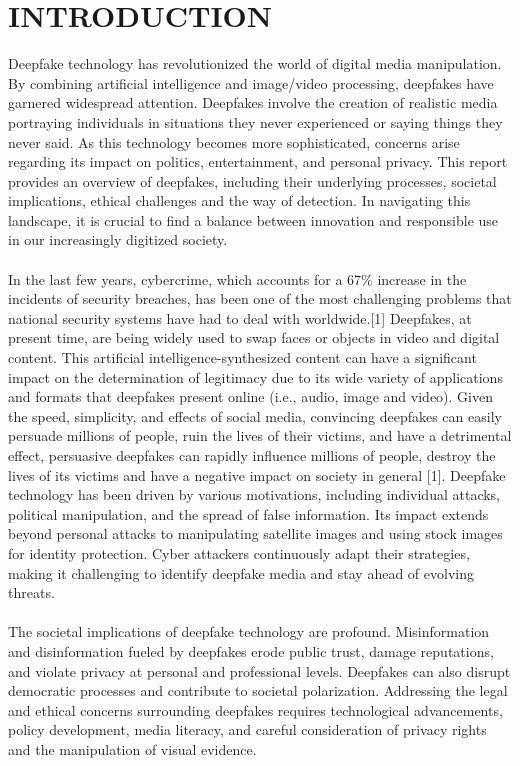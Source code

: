 

\section{INTRODUCTION}
Deepfake technology has revolutionized the world of digital media manipulation. By combining artificial intelligence and image/video processing, deepfakes have garnered widespread attention. Deepfakes involve the creation of realistic media portraying individuals in situations they never experienced or saying things they never said. As this technology becomes more sophisticated, concerns arise regarding its impact on politics, entertainment, and personal privacy. This report provides an overview of deepfakes, including their underlying processes, societal implications, ethical challenges and the way of detection. In navigating this landscape, it is crucial to find a balance between innovation and responsible use in our increasingly digitized society.
\\
\\
In the last few years, cybercrime, which accounts for a 67\% increase in the incidents of security breaches, has been one of the most challenging problems that national security systems have had to deal with worldwide.[1]
Deepfakes, at present time, are being widely used to swap faces or objects in video and digital content. This artificial intelligence-synthesized
content can have a significant impact on the determination of legitimacy due to its wide variety of applications and formats that deepfakes present online (i.e., audio, image and video).
Given the speed, simplicity, and effects of social media, convincing deepfakes can easily persuade millions of people, ruin the lives of their victims, and have a detrimental effect, persuasive deepfakes can rapidly influence millions of people, destroy the lives of its victims and have a negative impact on society in general [1].
Deepfake technology has been driven by various motivations, including individual attacks, political manipulation, and the spread of false information. Its impact extends beyond personal attacks to manipulating satellite images and using stock images for identity protection. Cyber attackers continuously adapt their strategies, making it challenging to identify deepfake media and stay ahead of evolving threats.
\\\\
The societal implications of deepfake technology are profound. Misinformation and disinformation fueled by deepfakes erode public trust, damage reputations, and violate privacy at personal and professional levels. Deepfakes can also disrupt democratic processes and contribute to societal polarization. Addressing the legal and ethical concerns surrounding deepfakes requires technological advancements, policy development, media literacy, and careful consideration of privacy rights and the manipulation of visual evidence.
